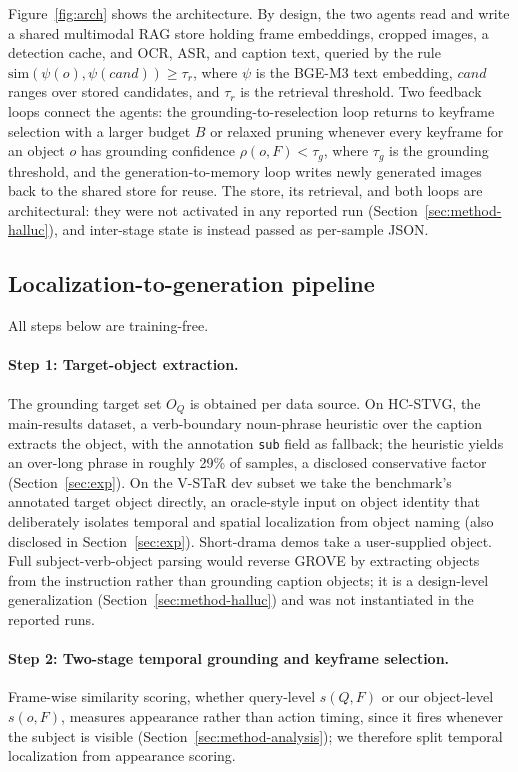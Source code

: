 \documentclass[10pt]{article}
\begin{document}
Figure~\ref{fig:arch} shows the architecture. By design, the two agents read and write a shared multimodal RAG store holding frame embeddings, cropped images, a detection cache, and OCR, ASR, and caption text, queried by the rule $\mathrm{sim}(\psi(o), \psi(cand)) \ge \tau_r$, where $\psi$ is the BGE-M3 text embedding, $cand$ ranges over stored candidates, and $\tau_r$ is the retrieval threshold. Two feedback loops connect the agents: the grounding-to-reselection loop returns to keyframe selection with a larger budget $B$ or relaxed pruning whenever every keyframe for an object $o$ has grounding confidence $\rho(o,F) < \tau_g$, where $\tau_g$ is the grounding threshold, and the generation-to-memory loop writes newly generated images back to the shared store for reuse. The store, its retrieval, and both loops are architectural: they were not activated in any reported run (Section~\ref{sec:method-halluc}), and inter-stage state is instead passed as per-sample JSON.

\subsection{Localization-to-generation pipeline}\label{sec:method-pipeline}

All steps below are training-free.

\paragraph{Step 1: Target-object extraction.} The grounding target set $O_Q$ is obtained per data source. On HC-STVG, the main-results dataset, a verb-boundary noun-phrase heuristic over the caption extracts the object, with the annotation \texttt{sub} field as fallback; the heuristic yields an over-long phrase in roughly 29\% of samples, a disclosed conservative factor (Section~\ref{sec:exp}). On the V-STaR dev subset we take the benchmark's annotated target object directly, an oracle-style input on object identity that deliberately isolates temporal and spatial localization from object naming (also disclosed in Section~\ref{sec:exp}). Short-drama demos take a user-supplied object. Full subject-verb-object parsing would reverse GROVE \citep{grove2503} by extracting objects from the instruction rather than grounding caption objects; it is a design-level generalization (Section~\ref{sec:method-halluc}) and was not instantiated in the reported runs.

\paragraph{Step 2: Two-stage temporal grounding and keyframe selection.} Frame-wise similarity scoring, whether query-level $s(Q,F)$ \citep{aks2502} or our object-level $s(o,F)$, measures appearance rather than action timing, since it fires whenever the subject is visible (Section~\ref{sec:method-analysis}); we therefore split temporal localization from appearance scoring.
\end{document}
